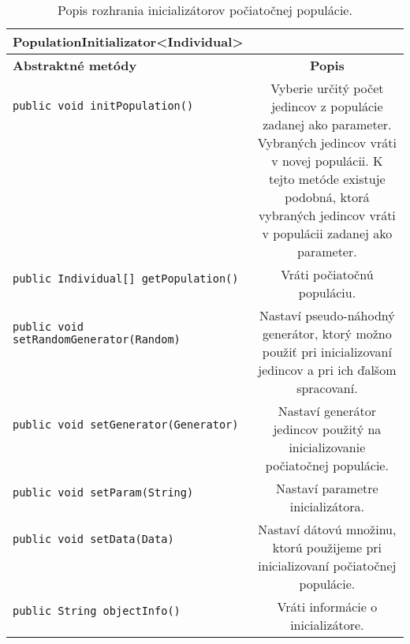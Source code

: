 \begin{table}
\centering
\begin{tabular}{|l|c|}
\hline
\textbf{PopulationInitializator<Individual>} & \\
\hline\hline
\textbf{Abstraktné metódy} & \textbf{Popis} \\
\hline
\verb|public void initPopulation()| & \multirow{9}{5cm}{Vyberie určitý počet jedincov z populácie zadanej ako parameter. Vybraných jedincov vráti v novej populácii. K tejto metóde existuje podobná, ktorá vybraných jedincov vráti v populácii zadanej ako parameter.} \\
& \\
& \\
& \\
& \\
& \\
& \\
& \\
& \\
\hline
\verb|public Individual[] getPopulation()| & \multirow{2}{5cm}{Vráti počiatočnú populáciu.} \\
& \\ 
\hline
\verb|public void setRandomGenerator(Random)| & \multirow{5}{5cm}{Nastaví pseudo-náhodný generátor, ktorý možno použiť pri inicializovaní jedincov a pri ich ďalšom spracovaní.} \\
& \\
& \\
& \\
& \\
\hline
\verb|public void setGenerator(Generator)| & \multirow{3}{5cm}{Nastaví generátor jedincov použitý na inicializovanie počiatočnej populácie.} \\
& \\
& \\
\hline
\verb|public void setParam(String)| & \multirow{2}{5cm}{Nastaví parametre inicializátora.} \\
& \\
\hline
\verb|public void setData(Data)| & \multirow{4}{5cm}{Nastaví dátovú množinu, ktorú použijeme pri inicializovaní počiatočnej populácie.} \\
& \\
& \\
& \\
\hline
\verb|public String objectInfo()| & \multirow{2}{5cm}{Vráti informácie o inicializátore.} \\
& \\ 
\hline
\end{tabular}
\caption{Popis rozhrania inicializátorov počiatočnej populácie.}\label{fig:tabpopinit}
\end{table}

